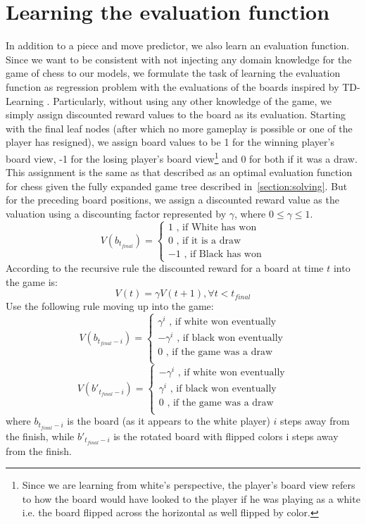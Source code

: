 \section{Learning the evaluation function}
\label{section:eval-func}
In addition to a piece and move predictor, we also learn an evaluation 
function. Since we want to be consistent with not injecting any domain 
knowledge for the game of chess to our models, we formulate the task of 
learning the evaluation function as regression problem with the evaluations of 
the boards inspired by TD-Learning \cite{Barto89learningand, 
sutton1988learning}. Particularly, without using any other knowledge of the 
game, we simply assign discounted reward values to the board as its evaluation. 
Starting with the final leaf nodes (after which no more gameplay is possible or 
one of the player has resigned), we assign board values to be 1 for the winning 
player's board view, -1 for the losing player's board 
view\footnote{Since we are learning from white's perspective, the player's 
board view refers to how the board would have looked to the player if he was 
playing as a white i.e. the board flipped across the horizontal as well 
flipped by color.} and 0 for both if it was a draw. This assignment is the same 
as that 
described as an optimal evaluation function for chess given the fully expanded 
game tree described in~\ref{section:solving}. But for the preceding board 
positions, we assign a discounted reward value as the valuation using a 
discounting factor represented by $\gamma$, where $0\leq \gamma \leq 1$.
\[V(b_{t_{final}}) = \begin{cases}
1 \text{ , if White has won}\\
0 \text{ , if it is a draw}\\
-1 \text{ , if Black has won}
\end{cases}\]
According to the recursive rule the discounted reward for a board at time $t$ 
into the game is:
\[V(t) = \gamma V(t+1) , \forall t<t_{final}\]
Use the following rule moving up into the game:
\[V(b_{t_{final}-i}) = \begin{cases}
		\gamma^{i} \text{ , if white won eventually}\\
                -\gamma^{i} \text{ , if black won eventually}\\
                0 \text{ , if the game was a draw}\\
               \end{cases}\]
\[V(b'_{t_{final}-i}) = \begin{cases}
		-\gamma^{i} \text{ , if white won eventually}\\
                \gamma^{i} \text{ , if black won eventually}\\
                0 \text{ , if the game was a draw}\\
               \end{cases}\]
where $b_{t_{final}-i}$ is the board (as it appears to the white player) $i$ 
steps away from the finish, while $b'_{t_{final}-i}$ is the rotated board with 
flipped colors i steps away from the finish.\\

